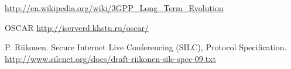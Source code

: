\begin{thebibliography}{666}
 \url{http://en.wikipedia.org/wiki/3GPP_Long_Term_Evolution}

 OSCAR \url{http://iserverd.khstu.ru/oscar/}

 P. Riikonen.
Secure Internet Live Conferencing (SILC), Protocol Specification.
\url{http://www.silcnet.org/docs/draft-riikonen-silc-spec-09.txt}



\end{thebibliography}
